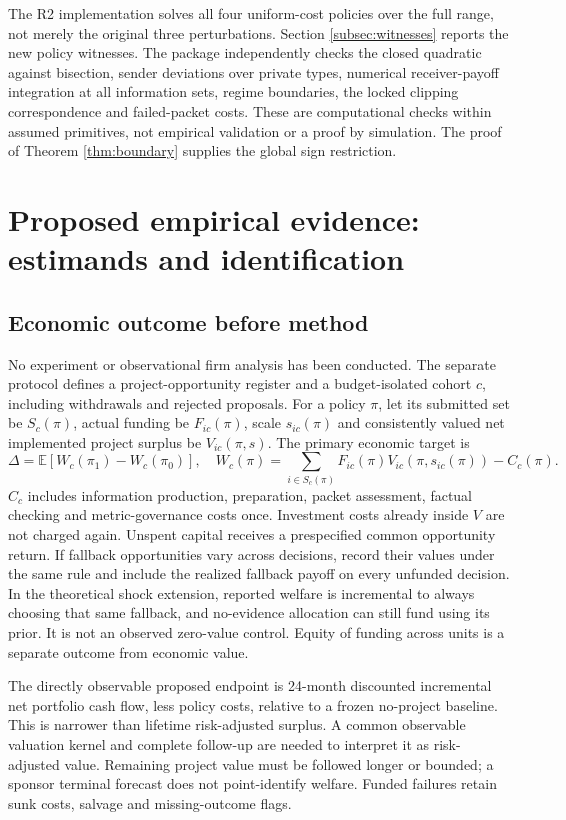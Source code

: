 \documentclass[11pt]{article}
\newcommand{\E}{\mathbb E}
\begin{document}
The R2 implementation solves all four uniform-cost policies over the full range, not merely the original three perturbations. Section \ref{subsec:witnesses} reports the new policy witnesses. The package independently checks the closed quadratic against bisection, sender deviations over private types, numerical receiver-payoff integration at all information sets, regime boundaries, the locked clipping correspondence and failed-packet costs. These are computational checks within assumed primitives, not empirical validation or a proof by simulation. The proof of Theorem \ref{thm:boundary} supplies the global sign restriction.

\section{Proposed empirical evidence: estimands and identification}\label{sec:empirical}
\subsection{Economic outcome before method}
No experiment or observational firm analysis has been conducted. The separate protocol defines a project-opportunity register and a budget-isolated cohort $c$, including withdrawals and rejected proposals. For a policy $\pi$, let its submitted set be $S_c(\pi)$, actual funding be $F_{ic}(\pi)$, scale $s_{ic}(\pi)$ and consistently valued net implemented project surplus be $V_{ic}(\pi,s)$. The primary economic target is
\begin{equation}\Delta=\E[W_c(\pi_1)-W_c(\pi_0)],\quad
W_c(\pi)=\sum_{i\in S_c(\pi)}F_{ic}(\pi)V_{ic}(\pi,s_{ic}(\pi))-C_c(\pi).\label{eq:empirical}\end{equation}
$C_c$ includes information production, preparation, packet assessment, factual checking and metric-governance costs once. Investment costs already inside $V$ are not charged again. Unspent capital receives a prespecified common opportunity return. If fallback opportunities vary across decisions, record their values under the same rule and include the realized fallback payoff on every unfunded decision. In the theoretical shock extension, reported welfare is incremental to always choosing that same fallback, and no-evidence allocation can still fund using its prior. It is not an observed zero-value control. Equity of funding across units is a separate outcome from economic value.

The directly observable proposed endpoint is 24-month discounted incremental net portfolio cash flow, less policy costs, relative to a frozen no-project baseline. This is narrower than lifetime risk-adjusted surplus. A common observable valuation kernel and complete follow-up are needed to interpret it as risk-adjusted value. Remaining project value must be followed longer or bounded; a sponsor terminal forecast does not point-identify welfare. Funded failures retain sunk costs, salvage and missing-outcome flags.
\end{document}
